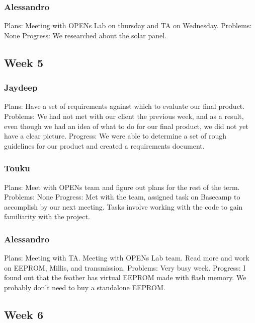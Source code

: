 \documentclass[onecolumn, draftclsnofoot,10pt, compsoc]{IEEEtran}
\begin{document}
\subsubsection{Alessandro}
Plans:  Meeting with OPENs Lab on thursday and TA on Wednesday.
\newline
Problems: None
\newline
Progress: We researched about the solar panel.

\subsection{Week 5}
\subsubsection{Jaydeep}
Plans:  Have a set of requirements against which to evaluate our final product. 
\newline
Problems: We had not met with our client the previous week, and as a result, even though we had an idea of what to do for our final product, we did not yet have a clear picture. 
\newline
Progress:  We were able to determine a set of rough guidelines for our product and created a requirements document. 

\subsubsection{Touku}
Plans: Meet with OPENs team and figure out plans for the rest of the term.
\newline
Problems: None
\newline
Progress: Met with the team, assigned task on Basecamp to accomplish by our next meeting.  Tasks involve working with the code to gain familiarity with the project.

\subsubsection{Alessandro}
Plans: Meeting with TA. Meeting with OPENs Lab team. Read more and work on EEPROM, Millis, and transmission.
\newline
Problems: Very busy week.
\newline
Progress: I found out that the feather has virtual EEPROM made with flash memory. We probably don't need to buy a standalone EEPROM.

\subsection{Week 6}
\end{document}

